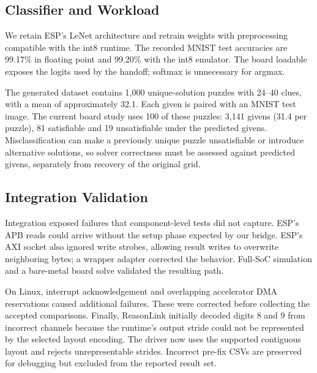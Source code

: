 
\subsection{Classifier and Workload}
We retain ESP's LeNet architecture and retrain weights with preprocessing compatible with the int8 runtime. The recorded MNIST test accuracies are 99.17\% in floating point and 99.20\% with the int8 emulator. The board loadable exposes the logits used by the handoff; softmax is unnecessary for argmax.

The generated dataset contains 1,000 unique-solution puzzles with 24--40 clues, with a mean of approximately 32.1. Each given is paired with an MNIST test image. The current board study uses 100 of these puzzles: 3,141 givens (31.4 per puzzle), 81 satisfiable and 19 unsatisfiable under the predicted givens. Misclassification can make a previously unique puzzle unsatisfiable or introduce alternative solutions, so solver correctness must be assessed against predicted givens, separately from recovery of the original grid.

\subsection{Integration Validation}
Integration exposed failures that component-level tests did not capture. ESP's APB reads could arrive without the setup phase expected by our bridge. ESP's AXI socket also ignored write strobes, allowing result writes to overwrite neighboring bytes; a wrapper adapter corrected the behavior. Full-SoC simulation and a bare-metal board solve validated the resulting path.

On Linux, interrupt acknowledgement and overlapping accelerator DMA reservations caused additional failures. These were corrected before collecting the accepted comparisons. Finally, ReasonLink initially decoded digits 8 and 9 from incorrect channels because the runtime's output stride could not be represented by the selected layout encoding. The driver now uses the supported contiguous layout and rejects unrepresentable strides. Incorrect pre-fix CSVs are preserved for debugging but excluded from the reported result set.
